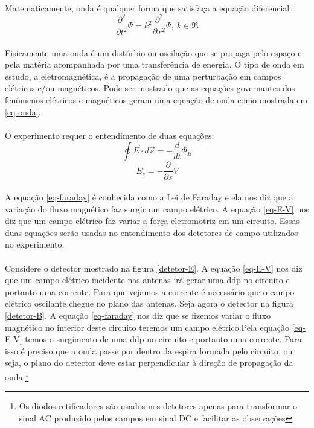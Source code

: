 \documentclass[a4paper,11pt]{article}
\begin{document}
\paragraph{} Matematicamente, onda é qualquer forma que satisfaça a equação diferencial :
\begin{equation}
\frac{\partial ^2}{\partial t^2 }\Psi = k^2 \frac{\partial ^2}{\partial x^2 }\Psi ,\: k \in \Re
\label{eq-onda}
\end{equation}

\paragraph{} Fisicamente uma onda é um distúrbio ou oscilação que se propaga pelo espaço e pela matéria acompanhada por uma transferência de energia. O tipo de onda em estudo, a eletromagnética, é a propagação de uma perturbação em campos elétricos e/ou magnéticos. Pode ser mostrado que as equações governantes dos fenômenos elétricos e magnéticos geram uma equação de onda como mostrada em \ref{eq-onda}.

\paragraph{}O experimento requer o entendimento de duas equações:
\begin{equation}
\oint \vec{E} \cdot d\vec{s} = -\frac{d}{dt}\Phi_B
\label{eq-faraday}
\end{equation}
\begin{equation}
E_s = -\frac{\partial}{\partial s}V
\label{eq-E-V}
\end{equation}


\paragraph{}A equação \ref{eq-faraday} é conhecida como a Lei de Faraday e ela nos diz que a variação do fluxo magnético faz surgir um campo elétrico. A equação \ref{eq-E-V} nos diz que um campo elétrico faz variar a força eletromotriz em um circuito. Essas duas equações serão usadas no entendimento dos detetores de campo utilizados no experimento.

\paragraph{}Considere o detector mostrado na figura \ref{detetor-E}. A equação \ref{eq-E-V} nos diz que um campo elétrico incidente nas antenas irá gerar uma ddp no circuito e portanto uma corrente. Para que vejamos a corrente é necessário que o campo elétrico oscilante chegue no plano das antenas. Seja agora o detector na figura \ref{detetor-B}. A equação \ref{eq-faraday} nos diz que se fizemos variar o fluxo magnético no interior deste circuito teremos um campo elétrico.Pela equação \ref{eq-E-V} temos o surgimento de uma ddp no circuito e portanto uma corrente. Para isso é preciso que a onda passe por dentro da espira formada pelo circuito, ou seja, o plano do detector deve estar perpendicular à direção de propagação da onda.\footnote{Os diodos retificadores são usados nos detetores apenas para transformar o sinal AC produzido pelos campos em sinal DC e facilitar as observações}
\end{document}
